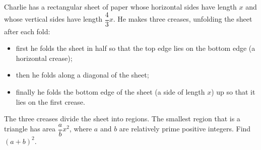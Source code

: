 Charlie has a rectangular sheet of paper whose horizontal sides have length $x$ and whose vertical sides have length $\dfrac43x$. He makes three creases, unfolding the sheet after each fold:
\begin{itemize}
\item first he folds the sheet in half so that the top edge lies on the bottom edge (a horizontal crease);
\item then he folds along a diagonal of the sheet;
\item finally he folds the bottom edge of the sheet (a side of length $x$) up so that it lies on the first crease.
\end{itemize}
The three creases divide the sheet into regions. The smallest region that is a triangle has area $\dfrac abx^2$, where $a$ and $b$ are relatively prime positive integers. Find $(a+b)^2$.

